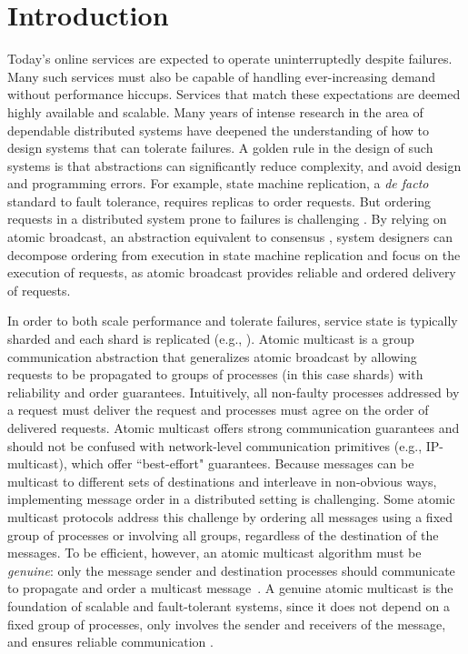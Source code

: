 \section{Introduction}
\label{sec:introduction}

Today's online services are expected to operate uninterruptedly despite failures.
Many such services must also be capable of handling ever-increasing demand without performance hiccups.
Services that match these expectations are deemed highly available and scalable.
Many years of intense research in the area of dependable distributed systems have deepened the understanding of how to design systems that can tolerate failures.
A golden rule in the design of such systems is that abstractions can significantly reduce complexity, and avoid design and programming errors.
For example, state machine replication, a \emph{de facto} standard to fault tolerance, requires replicas to order requests.
But ordering requests in a distributed system prone to failures is challenging \cite{FLP85}.
By relying on atomic broadcast, an abstraction equivalent to consensus \cite{HT93,CT96}, system designers can decompose ordering from execution in state machine replication and focus on the execution of requests, as atomic broadcast provides reliable and ordered delivery of requests.

In order to both scale performance and tolerate failures, service state is typically sharded and each shard is replicated (e.g., \cite{CDE12,Long2019,Aguilera:2007}).
Atomic multicast is a group communication abstraction that generalizes atomic broadcast by allowing requests to be propagated to groups of processes (in this case shards) with reliability and order guarantees.
Intuitively, all non-faulty processes addressed by a request must deliver the request and processes must agree on the order of delivered requests.
Atomic multicast offers strong communication guarantees and should not be confused with network-level communication primitives (e.g., IP-multicast), which offer ``best-effort" guarantees.
Because messages can be multicast to different sets of destinations and interleave in non-obvious ways, implementing message order in a distributed setting is challenging.
Some atomic multicast protocols address this challenge by ordering all messages using a fixed group of processes or involving all groups, regardless of the destination of the messages.
To be efficient, however, an atomic multicast algorithm must be \emph{genuine}: only the message sender and destination processes should communicate to propagate and order a multicast message~\cite{GS01b}.
A genuine atomic multicast is the foundation of scalable and fault-tolerant systems, since it does not depend on a fixed group of processes, only involves the sender and receivers of the message, and ensures reliable communication \cite{Coelho2017}.

